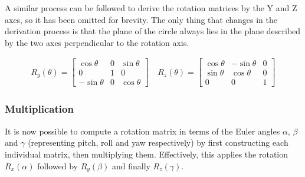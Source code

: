 \documentclass[12pt, a4paper]{article}
\begin{document}
A  similar process can be followed to derive the rotation matrices by the Y and
Z axes, so it has been omitted for brevity. The only thing that changes in the
derivation process is that the plane of the circle always lies in the plane
described by the two axes perpendicular to the rotation axis.

\begin{align*}
    R_y(\theta) = \begin{bmatrix}
                      \cos \theta  & 0 & \sin \theta \\
                      0            & 1 & 0           \\
                      -\sin \theta & 0 & \cos \theta
                  \end{bmatrix}
    \quad
    R_z(\theta) = \begin{bmatrix}
                      \cos \theta & -\sin \theta & 0 \\
                      \sin \theta & \cos \theta  & 0 \\
                      0           & 0            & 1
                  \end{bmatrix}
\end{align*}

\subsubsection{Multiplication}

It is now possible to compute a rotation matrix in terms of the Euler angles
$\alpha$, $\beta$ and $\gamma$ (representing pitch, roll and yaw respectively)
by first constructing each individual matrix, then multiplying them.
Effectively, this applies the rotation $R_x(\alpha)$ followed by $R_y(\beta)$
and finally $R_z(\gamma)$.
\end{document}
